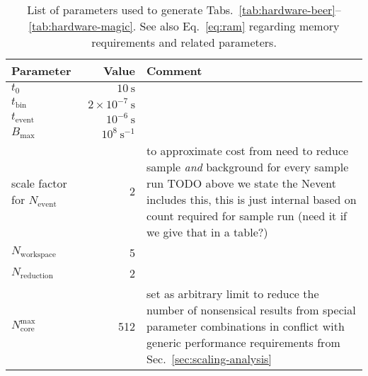 \documentclass[a4paper,english,numbers=noenddot,bibliography=totoc,chapterprefix=on,DIV=12]{scrartcl}
\newcommand{\Tbin}{t_{\text{bin}}}
\newcommand{\Tevent}{t_{\text{event}}}
\newcommand{\Ncore}{N_{\text{core}}}
\newcommand{\Nevent}{N_{\text{event}}}
\newcommand{\Nreduction}{N_{\text{reduction}}}
\newcommand{\Nworkspace}{N_{\text{workspace}}}
\newcommand{\Bmax}{B_{\text{max}}}
\begin{document}
\begin{table}
  \centering
  \begin{tabular}{lrp{8cm}}
    Parameter & Value & Comment\\
    \hline
    $t_0$ & $10~\mathrm{s}$ \\
    $\Tbin$ & $2\times10^{-7}~\mathrm{s}$ \\
    $\Tevent$ & $10^{-6}~\mathrm{s}$ \\
    $\Bmax$ & $10^8~\mathrm{s}^{-1}$ \\
    scale factor for $\Nevent$ & 2 & to approximate cost from need to reduce sample \emph{and} background for every sample run TODO above we state the Nevent includes this, this is just internal based on count required for sample run (need it if we give that in a table?) \\
    $\Nworkspace$ & 5 \\
    $\Nreduction$ & 2 \\
    $\Ncore^{\text{max}}$ & 512 & set as arbitrary limit to reduce the number of nonsensical results from special parameter combinations in conflict with generic performance requirements from Sec.~\ref{sec:scaling-analysis} \\
    \hline
  \end{tabular}
  \caption{\label{tab:hardware-estimation-parameters}
  List of parameters used to generate Tabs.~\ref{tab:hardware-beer}--\ref{tab:hardware-magic}.
  See also Eq.~\eqref{eq:ram} regarding memory requirements and related parameters.
}
\end{table}
\end{document}
